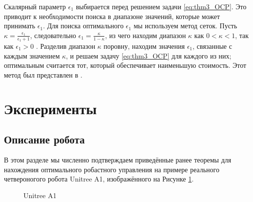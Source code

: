 Скалярный параметр $\epsilon_1$ выбирается перед решением задачи \eqref{eq:thm3_OCP}. Это приводит к необходимости поиска в диапазоне значений, которые может принимать $\epsilon_1$. Для поиска оптимального $\epsilon_1$ мы используем метод сеток. Пусть $\kappa=\frac{\epsilon_1}{\epsilon_1+1}$, следовательно
$\epsilon_1=\frac{\kappa}{1-\kappa}$, из чего находим диапазон $\kappa$ как $0 < \kappa < 1$, так как $\epsilon_1 > 0$ \cite{Li1997}. Разделив диапазон $\kappa$ поровну, находим значения $\epsilon_1$, связанные с каждым значением $\kappa$, и решаем задачу \eqref{eq:thm3_OCP} для каждого из них; оптимальным считается тот, который обеспечивает наименьшую стоимость. Этот метод был представлен в \cite{Li1997}.

\section{Эксперименты}\label{sec:ch3/sect3}
\subsection{Описание робота}\label{sec:ch3/sect3/sub1}
В этом разделе мы численно подтверждаем приведённые ранее теоремы для нахождения оптимального робастного управления на примере реального четвероногого робота Unitree A1, изображённого на Рисунке \cref{fig:unitree}.
\begin{figure}[ht]
	\caption{Unitree A1}\label{fig:unitree}
\end{figure} 

